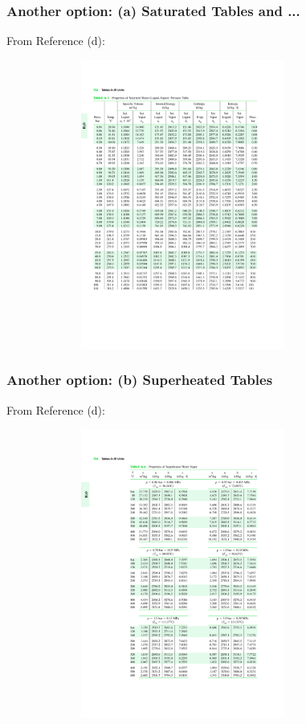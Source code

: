 \documentclass[10pt,compress]{beamer}
\begin{document}
\begin{frame}
  \frametitle{Another option: (a) Saturated Tables and ...}
\scriptsize{From Reference (d):}\vspace{-.8cm}
   \begin{center}
   \begin{figure}
      \includegraphics[width=9.5cm,height=9.5cm,clip]{./Pics/WaterSatTable}
   \end{figure}
   \end{center}
\end{frame}


\begin{frame}
  \frametitle{Another option: (b) Superheated Tables}
\scriptsize{From Reference (d):}\vspace{-.8cm}
   \begin{center}
   \begin{figure}
      \includegraphics[width=9.5cm,height=9.5cm,clip]{./Pics/Water_SuperheatedTable}
   \end{figure}
   \end{center}
\end{frame}
\end{document}
